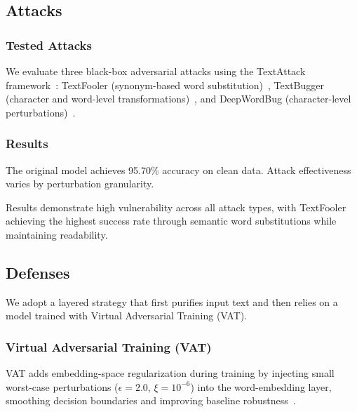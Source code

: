 \documentclass[conference]{IEEEtran}
\begin{document}
\subsection{Attacks}
\subsubsection{Tested Attacks}
We evaluate three black-box adversarial attacks using the TextAttack framework~\cite{morris2020textattack}: TextFooler (synonym-based word substitution)~\cite{jin2019textfooler}, TextBugger (character and word-level transformations)~\cite{li2018textbugger}, and DeepWordBug (character-level perturbations)~\cite{gao2018deepwordbug}.

\subsubsection{Results}
The original model achieves 95.70\% accuracy on clean data. Attack effectiveness varies by perturbation granularity.

\begin{table}[H]
\caption{NLP Adversarial Attack Effectiveness}
\label{tab:nlp_attack_effectiveness}
\centering
\footnotesize
{}
\end{table}

Results demonstrate high vulnerability across all attack types, with TextFooler achieving the highest success rate through semantic word substitutions while maintaining readability.

\subsection{Defenses}
We adopt a layered strategy that first purifies input text and then relies on a model trained with Virtual Adversarial Training (VAT).

\subsubsection{Virtual Adversarial Training (VAT)}
VAT adds embedding-space regularization during training by injecting small worst-case perturbations ($\epsilon\!=\!2.0$, $\xi\!=\!10^{-6}$) into the word-embedding layer, smoothing decision boundaries and improving baseline robustness~\cite{miyato2017virtual}.
\end{document}
